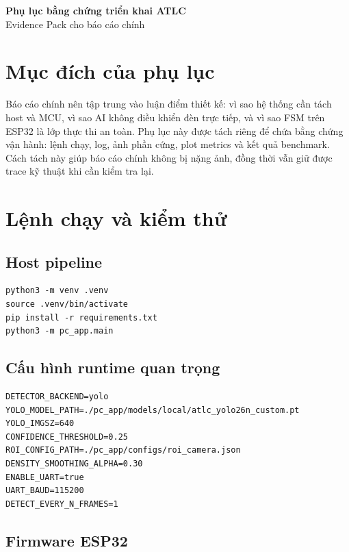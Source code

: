 \documentclass[12pt,a4paper]{article}
\begin{document}
\begin{center}
{\LARGE \textbf{Phụ lục bằng chứng triển khai ATLC}}\\[0.6em]
{\large Evidence Pack cho báo cáo chính}
\end{center}

\tableofcontents
\clearpage

\section{Mục đích của phụ lục}

Báo cáo chính nên tập trung vào luận điểm thiết kế: vì sao hệ thống cần tách host và MCU, vì sao AI không điều khiển đèn trực tiếp, và vì sao FSM trên ESP32 là lớp thực thi an toàn. Phụ lục này được tách riêng để chứa bằng chứng vận hành: lệnh chạy, log, ảnh phần cứng, plot metrics và kết quả benchmark. Cách tách này giúp báo cáo chính không bị nặng ảnh, đồng thời vẫn giữ được trace kỹ thuật khi cần kiểm tra lại.

\section{Lệnh chạy và kiểm thử}

\subsection{Host pipeline}

\begin{lstlisting}
python3 -m venv .venv
source .venv/bin/activate
pip install -r requirements.txt
python3 -m pc_app.main
\end{lstlisting}

\subsection{Cấu hình runtime quan trọng}

\begin{lstlisting}
DETECTOR_BACKEND=yolo
YOLO_MODEL_PATH=./pc_app/models/local/atlc_yolo26n_custom.pt
YOLO_IMGSZ=640
CONFIDENCE_THRESHOLD=0.25
ROI_CONFIG_PATH=./pc_app/configs/roi_camera.json
DENSITY_SMOOTHING_ALPHA=0.30
ENABLE_UART=true
UART_BAUD=115200
DETECT_EVERY_N_FRAMES=1
\end{lstlisting}

\subsection{Firmware ESP32}
\end{document}
